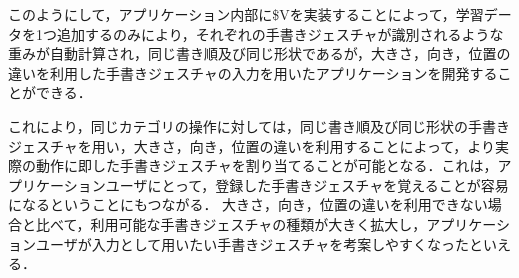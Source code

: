 \clearpage
このようにして，アプリケーション内部に\$Vを実装することによって，学習データを1つ追加するのみにより，それぞれの手書きジェスチャが識別されるような重みが自動計算され，同じ書き順及び同じ形状であるが，大きさ，向き，位置の違いを利用した手書きジェスチャの入力を用いたアプリケーションを開発することができる．


これにより，同じカテゴリの操作に対しては，同じ書き順及び同じ形状の手書きジェスチャを用い，大きさ，向き，位置の違いを利用することによって，より実際の動作に即した手書きジェスチャを割り当てることが可能となる．これは，アプリケーションユーザにとって，登録した手書きジェスチャを覚えることが容易になるということにもつながる．
大きさ，向き，位置の違いを利用できない場合と比べて，利用可能な手書きジェスチャの種類が大きく拡大し，アプリケーションユーザが入力として用いたい手書きジェスチャを考案しやすくなったといえる．


